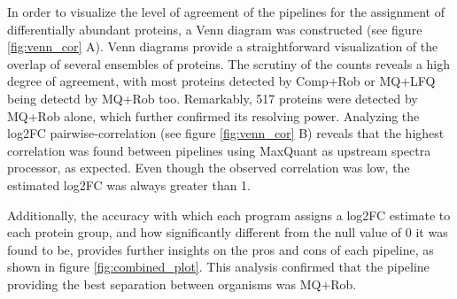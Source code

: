 \documentclass[11pt, a4paper]{report}
\begin{document}
In order to visualize the level of agreement of the pipelines for the assignment of differentially abundant proteins, a Venn diagram was constructed (see figure \ref{fig:venn_cor} A). Venn diagrams provide a straightforward visualization of the overlap of several ensembles of proteins. The scrutiny of the counts reveals a high degree of agreement, with most proteins detected by Comp+Rob or MQ+LFQ being detectd by MQ+Rob too. Remarkably, 517 proteins were detected by MQ+Rob alone, which further confirmed its resolving power. Analyzing the log2FC pairwise-correlation (see figure \ref{fig:venn_cor} B) reveals that the highest correlation was found between pipelines using MaxQuant as upstream spectra processor, as expected. Even though the observed correlation was low, the estimated log2FC was always greater than 1.


Additionally, the accuracy with which each program assigns a \ac{log2FC} estimate to each protein group, and how significantly different from the null value of 0 it was found to be, provides further insights on the pros and cons of each pipeline, as shown in figure \ref{fig:combined_plot}. This analysis confirmed that the pipeline providing the best separation between organisms was MQ+Rob.
\end{document}
